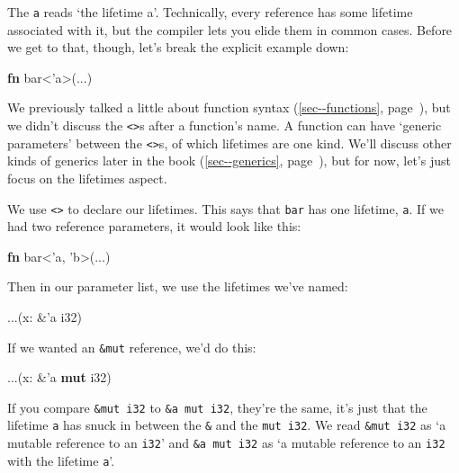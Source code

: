 \documentclass[a4paper,]{book}
\renewcommand*{\hyperref}[2][\ar]{%
  \def\ar{#2}%
  #2 (\autoref{#1}, page~\pageref{#1})}
\newenvironment{Shaded}{\begin{snugshade}}{\end{snugshade}}
\newcommand{\KeywordTok}[1]{\textcolor[rgb]{0.13,0.29,0.53}{\textbf{{#1}}}}
\newcommand{\DataTypeTok}[1]{\textcolor[rgb]{0.13,0.29,0.53}{{#1}}}
\newcommand{\OtherTok}[1]{\textcolor[rgb]{0.56,0.35,0.01}{{#1}}}
\newcommand{\NormalTok}[1]{{#1}}
\begin{document}
The \texttt{\textquotesingle{}a} reads `the lifetime a'. Technically,
every reference has some lifetime associated with it, but the compiler
lets you elide them in common cases. Before we get to that, though,
let's break the explicit example down:

\begin{Shaded}
\begin{Highlighting}[]
\KeywordTok{fn} \NormalTok{bar<}\OtherTok{'a}\NormalTok{>(...)}
\end{Highlighting}
\end{Shaded}

We previously talked a little about \hyperref[sec--functions]{function
syntax}, but we didn't discuss the \texttt{\textless{}\textgreater{}}s
after a function's name. A function can have `generic parameters'
between the \texttt{\textless{}\textgreater{}}s, of which lifetimes are
one kind. We'll discuss other kinds of generics
\hyperref[sec--generics]{later in the book}, but for now, let's just
focus on the lifetimes aspect.

We use \texttt{\textless{}\textgreater{}} to declare our lifetimes. This
says that \texttt{bar} has one lifetime, \texttt{\textquotesingle{}a}.
If we had two reference parameters, it would look like this:

\begin{Shaded}
\begin{Highlighting}[]
\KeywordTok{fn} \NormalTok{bar<}\OtherTok{'a}\NormalTok{, }\OtherTok{'b}\NormalTok{>(...)}
\end{Highlighting}
\end{Shaded}

Then in our parameter list, we use the lifetimes we've named:

\begin{Shaded}
\begin{Highlighting}[]
\NormalTok{...(x: &}\OtherTok{'a} \DataTypeTok{i32}\NormalTok{)}
\end{Highlighting}
\end{Shaded}

If we wanted an \texttt{\&mut} reference, we'd do this:

\begin{Shaded}
\begin{Highlighting}[]
\NormalTok{...(x: &}\OtherTok{'a} \KeywordTok{mut} \DataTypeTok{i32}\NormalTok{)}
\end{Highlighting}
\end{Shaded}

If you compare \texttt{\&mut\ i32} to
\texttt{\&\textquotesingle{}a\ mut\ i32}, they're the same, it's just
that the lifetime \texttt{\textquotesingle{}a} has snuck in between the
\texttt{\&} and the \texttt{mut\ i32}. We read \texttt{\&mut\ i32} as `a
mutable reference to an \texttt{i32}' and
\texttt{\&\textquotesingle{}a\ mut\ i32} as `a mutable reference to an
\texttt{i32} with the lifetime \texttt{\textquotesingle{}a}'.
\end{document}
